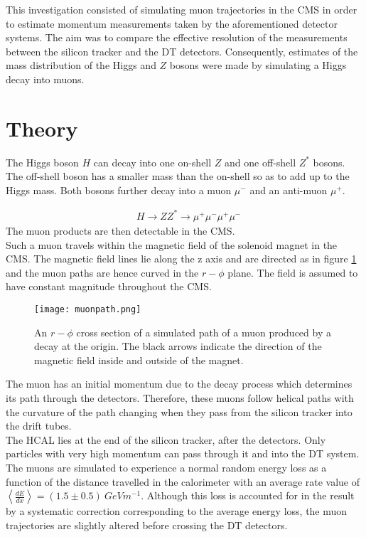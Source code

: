 \documentclass{article}
\begin{document}
This investigation consisted of simulating muon trajectories in the CMS in order to estimate momentum measurements taken by the aforementioned detector systems. The aim  was to compare the effective resolution of the measurements between the silicon tracker and the DT detectors. Consequently, estimates of the mass distribution of the Higgs and $Z$ bosons were made by simulating a Higgs decay into muons.



\section*{Theory}

The Higgs boson $H$ can decay into one on-shell $Z$ and one off-shell $Z^*$ bosons. The off-shell boson has a smaller mass than the on-shell so as to add up to the Higgs mass. Both bosons further decay into a muon $\mu^-$ and an anti-muon $\mu^+$.

\begin{align}
&H \rightarrow ZZ^* \rightarrow \mu^+\mu^-\mu^+\mu^- \label{higgsdecay}
\end{align}
The muon products are then detectable in the CMS.\\

Such a muon travels within the magnetic field of the solenoid magnet in the CMS. The magnetic field lines lie along the z axis and are directed as in figure \ref{muonpath} and the muon paths are hence curved in the $r-\phi$ plane. The field is assumed to have constant magnitude throughout the CMS.

\begin{figure}[h]
\centering
\texttt{[image: muonpath.png]}
\caption{An $r-\phi$ cross section of a simulated path of a muon produced by a decay at the origin. The black arrows indicate the direction of the magnetic field inside and outside of the magnet.}
	\label{muonpath}
\end{figure}

The muon has an initial momentum due to the decay process which determines its path through the detectors. Therefore, these muons follow helical paths with the curvature of the path changing when they pass from the silicon tracker into the drift tubes.\\

The HCAL lies at the end of the silicon tracker, after the detectors. Only particles with very high momentum can pass through it and into the DT system. The muons are simulated to experience a normal random energy loss as a function of the distance travelled in the calorimeter with an average rate value of $\left< \frac{dE}{dx} \right> = (1.5 \pm 0.5)\ GeVm^{-1}$. Although this loss is accounted for in the result by a systematic correction corresponding to the average energy loss, the muon trajectories are slightly altered before crossing the DT detectors.\\
\end{document}
